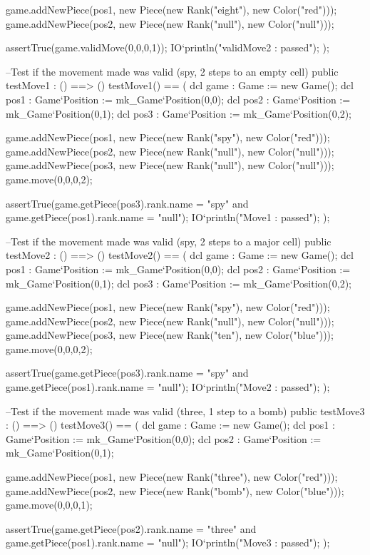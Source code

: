 \begin{vdm_al}
    game.addNewPiece(pos1, new Piece(new Rank("eight"), new Color("red")));
    game.addNewPiece(pos2, new Piece(new Rank("null"), new Color("null")));
    
    assertTrue(game.validMove(0,0,0,1));
    IO`println("validMove2 : passed");
   );
  
  --Test if the movement made was valid (spy, 2 steps to an empty cell)
  public testMove1 : () ==> ()
   testMove1() ==
   (
    dcl game : Game := new Game();
    dcl pos1 : Game`Position := mk_Game`Position(0,0);
    dcl pos2 : Game`Position := mk_Game`Position(0,1);
    dcl pos3 : Game`Position := mk_Game`Position(0,2);
    
    game.addNewPiece(pos1, new Piece(new Rank("spy"), new Color("red")));
    game.addNewPiece(pos2, new Piece(new Rank("null"), new Color("null")));
    game.addNewPiece(pos3, new Piece(new Rank("null"), new Color("null")));
    game.move(0,0,0,2);
    
    assertTrue(game.getPiece(pos3).rank.name = "spy" and game.getPiece(pos1).rank.name = "null");
    IO`println("Move1 : passed");
   );
  
  --Test if the movement made was valid (spy, 2 steps to a major cell)
  public testMove2 : () ==> ()
   testMove2() ==
   (
    dcl game : Game := new Game();
    dcl pos1 : Game`Position := mk_Game`Position(0,0);
    dcl pos2 : Game`Position := mk_Game`Position(0,1);
    dcl pos3 : Game`Position := mk_Game`Position(0,2);
    
    game.addNewPiece(pos1, new Piece(new Rank("spy"), new Color("red")));
    game.addNewPiece(pos2, new Piece(new Rank("null"), new Color("null")));
    game.addNewPiece(pos3, new Piece(new Rank("ten"), new Color("blue")));
    game.move(0,0,0,2);
    
    assertTrue(game.getPiece(pos3).rank.name = "spy" and game.getPiece(pos1).rank.name = "null");
    IO`println("Move2 : passed");
   );
  
  --Test if the movement made was valid (three, 1 step to a bomb)
  public testMove3 : () ==> ()
   testMove3() ==
   (
    dcl game : Game := new Game();
    dcl pos1 : Game`Position := mk_Game`Position(0,0);
    dcl pos2 : Game`Position := mk_Game`Position(0,1);
    
    game.addNewPiece(pos1, new Piece(new Rank("three"), new Color("red")));
    game.addNewPiece(pos2, new Piece(new Rank("bomb"), new Color("blue")));
    game.move(0,0,0,1);
    
    assertTrue(game.getPiece(pos2).rank.name = "three" and game.getPiece(pos1).rank.name = "null");
    IO`println("Move3 : passed");
   );
  

\end{vdm_al}
